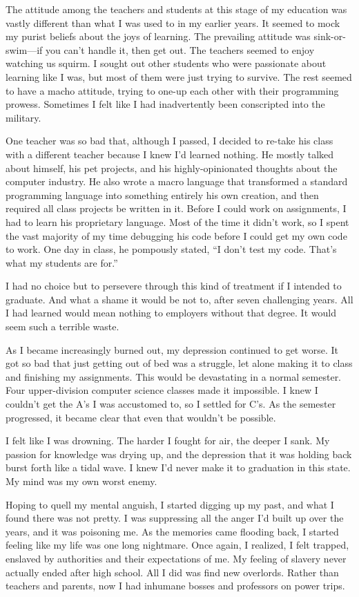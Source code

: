The attitude among the teachers and students at this stage of my education was vastly different than what I was used to in my earlier years. It seemed to mock my purist beliefs about the joys of learning. The prevailing attitude was sink-or-swim---if you can't handle it, then get out. The teachers seemed to enjoy watching us squirm. I sought out other students who were passionate about learning like I was, but most of them were just trying to survive. The rest seemed to have a macho attitude, trying to one-up each other with their programming prowess. Sometimes I felt like I had inadvertently been conscripted into the military.

One teacher was so bad that, although I passed, I decided to re-take his class with a different teacher because I knew I'd learned nothing. He mostly talked about himself, his pet projects, and his highly-opinionated thoughts about the computer industry. He also wrote a macro language that transformed a standard programming language into something entirely his own creation, and then required all class projects be written in it. Before I could work on assignments, I had to learn his proprietary language. Most of the time it didn't work, so I spent the vast majority of my time debugging his code before I could get my own code to work. One day in class, he pompously stated, ``I don't test my code. That's what my students are for.''

I had no choice but to persevere through this kind of treatment if I intended to graduate. And what a shame it would be not to, after seven challenging years. All I had learned would mean nothing to employers without that degree. It would seem such a terrible waste.

As I became increasingly burned out, my depression continued to get worse. It got so bad that just getting out of bed was a struggle, let alone making it to class and finishing my assignments. This would be devastating in a normal semester. Four upper-division computer science classes made it impossible. I knew I couldn't get the A's I was accustomed to, so I settled for C's. As the semester progressed, it became clear that even that wouldn't be possible.

I felt like I was drowning. The harder I fought for air, the deeper I sank. My passion for knowledge was drying up, and the depression that it was holding back burst forth like a tidal wave. I knew I'd never make it to graduation in this state. My mind was my own worst enemy.

Hoping to quell my mental anguish, I started digging up my past, and what I found there was not pretty. I was suppressing all the anger I'd built up over the years, and it was poisoning me. As the memories came flooding back, I started feeling like my life was one long nightmare. Once again, I realized, I felt trapped, enslaved by authorities and their expectations of me. My feeling of slavery never actually ended after high school. All I did was find new overlords. Rather than teachers and parents, now I had inhumane bosses and professors on power trips.

